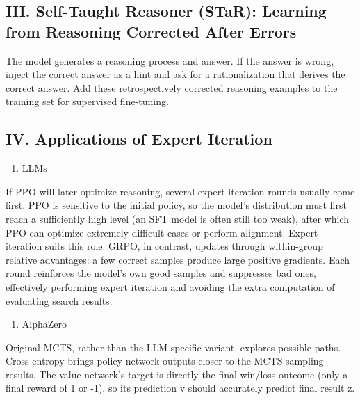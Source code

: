 \hypertarget{iii.-self-taught-reasoner-star-learning-from-reasoning-corrected-after-errors}{%
\subsection{III. Self-Taught Reasoner (STaR): Learning from Reasoning Corrected After Errors}\label{iii.-self-taught-reasoner-star-learning-from-reasoning-corrected-after-errors}}

The model generates a reasoning process and answer. If the answer is wrong, inject the correct answer as a hint and ask for a rationalization that derives the correct answer. Add these retrospectively corrected reasoning examples to the training set for supervised fine-tuning.

\hypertarget{iv.-applications-of-expert-iteration}{%
\subsection{IV. Applications of Expert Iteration}\label{iv.-applications-of-expert-iteration}}

\begin{enumerate}
\def\labelenumi{\arabic{enumi}.}
\tightlist
\item
  LLMs
\end{enumerate}

If PPO will later optimize reasoning, several expert-iteration rounds usually come first. PPO is sensitive to the initial policy, so the model's distribution must first reach a sufficiently high level (an SFT model is often still too weak), after which PPO can optimize extremely difficult cases or perform alignment. Expert iteration suits this role. GRPO, in contrast, updates through within-group relative advantages: a few correct samples produce large positive gradients. Each round reinforces the model's own good samples and suppresses bad ones, effectively performing expert iteration and avoiding the extra computation of evaluating search results.

\begin{enumerate}
\def\labelenumi{\arabic{enumi}.}
\setcounter{enumi}{1}
\tightlist
\item
  AlphaZero
\end{enumerate}

Original MCTS, rather than the LLM-specific variant, explores possible paths. Cross-entropy brings policy-network outputs closer to the MCTS sampling results. The value network's target is directly the final win/loss outcome (only a final reward of 1 or -1), so its prediction v should accurately predict final result z.

